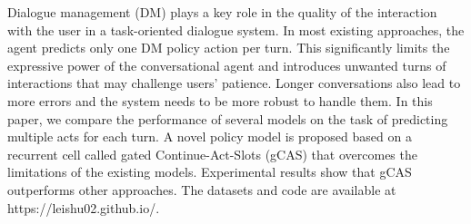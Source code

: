 Dialogue management (DM) plays a key role in the quality of the interaction with the user in a task-oriented dialogue system. In most existing approaches, the agent predicts only one DM policy action per turn. This significantly limits the expressive power of the conversational agent and introduces unwanted turns of interactions that may challenge users' patience.
Longer conversations also lead to more errors and the system needs to be more robust to handle them. In this paper, we compare the performance of several models on the task of predicting multiple acts for each turn. A novel policy model is proposed based on a recurrent cell called gated Continue-Act-Slots (gCAS) that overcomes the limitations of the existing models. Experimental results show that gCAS outperforms other approaches. The datasets and code are available at https://leishu02.github.io/.